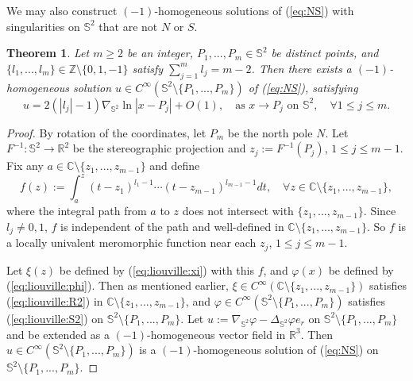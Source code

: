 \documentclass[12pt]{article}
\newtheorem{thm}{Theorem}[section]
\newcommand{\R}{\mathbb{R}}
\newcommand{\bS}{\mathbb{S}}
\begin{document}
We may also construct $(-1)$-homogeneous solutions of (\ref{eq:NS}) with singularities on $\bS^2$ that are not $N$ or $S$.

\begin{thm}\label{thm:3_1}
	Let $m\ge 2$ be an integer, $P_1, ..., P_{m}\in \mathbb{S}^2$ be distinct points, and $\{l_1, ..., l_{m}\}\in\mathbb{Z}\setminus\{0, 1, -1\}$ satisfy $\sum_{j=1}^{m}l_j=m-2$. Then there exists a $(-1)$-homogeneous solution $u\in C^{\infty}(\bS^2\setminus\{P_1, ..., P_{m}\})$ of (\ref{eq:NS}), satisfying 
	\begin{equation}\label{eq:thm:3_1} 
		u=2(|l_j|-1)\nabla_{\bS^2}\ln |x-P_j|+O(1), \quad \textrm{as }x\to P_j \textrm{ on }\bS^2, 
		\quad \forall 1\le j\le m.
	\end{equation}
\end{thm}
\begin{proof}
	By rotation of the coordinates, let $P_{m}$ be the north pole $N$. Let $F^{-1}: \mathbb{S}^2\to \R^2$ be the stereographic projection and $z_j:=F^{-1}(P_j)$, $1\le j\le m-1$. Fix any $a\in \mathbb{C}\setminus \{z_1, ..., z_{m-1}\}$ and define 
	\begin{equation}\label{eq:thm:3_1:f}
		f(z):=\int_a^z (t-z_1)^{l_1-1}\cdots (t-z_{m-1})^{l_{m-1}-1} dt, \quad \forall z\in \mathbb{C}\setminus\{z_1, ..., z_{m-1}\},
	\end{equation}
	where the integral path from $a$ to $z$ does not intersect with $\{z_1, ..., z_{m-1}\}$. Since $l_j\ne 0, 1$, $f$ is independent of the path and well-defined in $\mathbb{C}\setminus\{z_1, ..., z_{m-1}\}$. So $f$ is a locally univalent meromorphic function near each $z_j$, $1\le j\le m-1$. 

	Let $\xi(z)$ be defined by (\ref{eq:liouville:xi}) with this $f$, and $\varphi(x)$ be defined by (\ref{eq:liouville:phi}). Then as mentioned earlier, $\xi\in C^{\infty}(\mathbb{C}\setminus\{z_1, ..., z_{m-1}\})$ satisfies (\ref{eq:liouville:R2}) in $\mathbb{C}\setminus\{z_1, ..., z_{m-1}\}$, and $\varphi\in C^{\infty}(\bS^2\setminus\{P_1, ..., P_{m}\})$ satisfies (\ref{eq:liouville:S2}) on $\mathbb{S}^2 \setminus \{P_1, ..., P_{m}\}$. Let $u:=\nabla_{\bS^2} \varphi-\Delta_{\bS^2} \varphi e_r$ on $\mathbb{S}^2\setminus\{P_1, ..., P_{m}\}$ and be extended as a $(-1)$-homogeneous vector field in $\R^3$. Then $u\in C^{\infty}(\bS^2\setminus\{P_1, ..., P_{m}\})$ is a $(-1)$-homogeneous solution of (\ref{eq:NS}) on $\bS^2\setminus\{P_1, ..., P_{m}\}$.


\end{proof}
\end{document}
